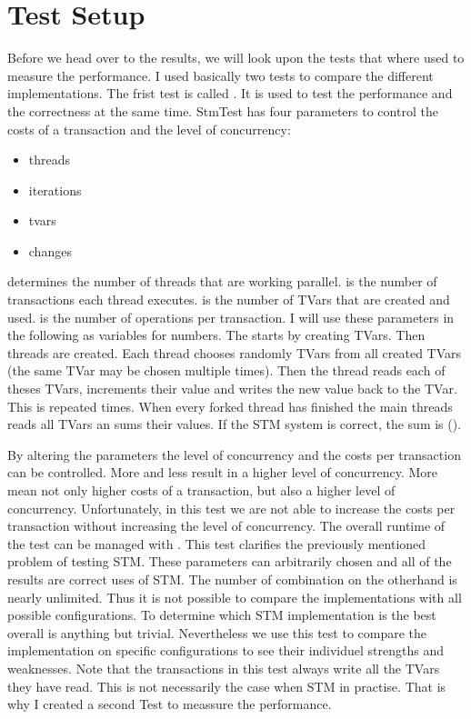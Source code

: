 \section{Test Setup}
Before we head over to the results, we will look upon the tests that where used to measure the performance.
I used basically two tests to compare the different implementations. The frist test is called .
It is used to test the performance and the correctness at the same time. StmTest has four parameters to control
the costs of a transaction and the level of concurrency:
\begin{itemize}
 \item threads
 \item iterations
 \item tvars
 \item changes
\end{itemize}
 determines the number of threads that are working parallel.  is the number of transactions
each thread executes.  is the number of TVars that are created and used.  is the number of 
operations per transaction. I will use these parameters in the following as variables for numbers.
The starts by creating  TVars. Then  threads are created. Each thread chooses randomly  TVars from all 
created TVars (the same TVar may be chosen multiple times). Then the thread reads each of theses TVars, increments their
value and writes the new value back to the TVar. This is repeated  times. When every forked thread has finished the
main threads reads all TVars an sums their values. If the STM system is correct, the sum is ().

By altering the parameters the level of concurrency and the costs per transaction can be controlled. More  and less 
 result in a higher level of concurrency. More  mean not only higher costs of a transaction, but also
a higher level of concurrency. Unfortunately, in this test we are not able to increase the costs per transaction without increasing
the level of concurrency. The overall runtime of the test can be managed with . 
This test clarifies the previously mentioned problem of testing STM. These parameters can arbitrarily chosen and all of the results
are correct uses of STM. The number of combination on the otherhand is nearly unlimited. Thus it is not possible to compare the 
implementations with all possible configurations. To determine which STM implementation is the best overall is anything but trivial.
Nevertheless we use this test to compare the implementation on specific configurations to see their individuel strengths and weaknesses.
Note that the transactions in this test always write all the TVars they have read. This is not necessarily the case when STM in practise. 
That is why I created a second Test to meassure the performance.

